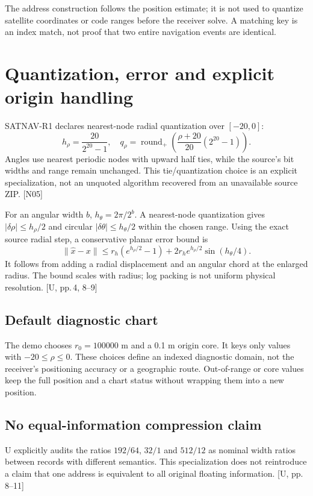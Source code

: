 \documentclass[11pt,a4paper]{article}
\newcommand{\src}[1]{\textcolor{muted}{[U, #1]}}
\newcommand{\dec}[1]{\textcolor{accent}{[N#1]}}
\begin{document}
The address construction follows the position estimate; it is not used to quantize
satellite coordinates or code ranges before the receiver solve. A matching key is an
index match, not proof that two entire navigation events are identical.
\clearpage

\section{Quantization, error and explicit origin handling}
SATNAV-R1 declares nearest-node radial quantization over $[-20,0]$:
\begin{equation}
h_\rho=\frac{20}{2^{20}-1},\quad
q_\rho=\operatorname{round}_{+}\!\left(\frac{\rho+20}{20}(2^{20}-1)\right).
\end{equation}
Angles use nearest periodic nodes with upward half ties, while the source's bit widths
and range remain unchanged. This tie/quantization choice is an explicit specialization,
not an unquoted algorithm recovered from an unavailable source ZIP. \dec{05}

For an angular width $b$, $h_\theta=2\pi/2^b$. A nearest-node quantization gives
$|\delta\rho|\le h_\rho/2$ and circular $|\delta\theta|\le h_\theta/2$ within the
chosen range. Using the exact source radial step, a conservative planar error bound is
\begin{equation}
\|\widehat x-x\|\le r_h(e^{h_\rho/2}-1)
+2r_he^{h_\rho/2}\sin(h_\theta/4).
\end{equation}
It follows from adding a radial displacement and an angular chord at the enlarged
radius. The bound scales with radius; log packing is not uniform physical resolution.
\src{pp.\,4, 8--9}

\subsection{Default diagnostic chart}
The demo chooses $r_0=100000$ m and a 0.1 m origin core. It keys only values with
$-20\le\rho\le0$. These choices define an indexed diagnostic domain, not the
receiver's positioning accuracy or a geographic route. Out-of-range or core values
keep the full position and a chart status without wrapping them into a new position.

\subsection{No equal-information compression claim}
U explicitly audits the ratios $192/64$, $32/1$ and $512/12$ as nominal width ratios
between records with different semantics. This specialization does not reintroduce
a claim that one address is equivalent to all original floating information.
\src{pp.\,8--11}
\end{document}
